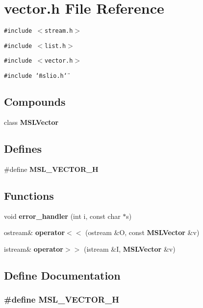 \section{vector.h File Reference}
\label{vector_8h}
{\tt \#include $<$stream.h$>$}\par
{\tt \#include $<$list.h$>$}\par
{\tt \#include $<$vector.h$>$}\par
{\tt \#include \char`\"{}mslio.h\char`\"{}}\par
\subsection*{Compounds}
\begin{CompactItemize}
\item 
class {\bf MSLVector}
\end{CompactItemize}
\subsection*{Defines}
\begin{CompactItemize}
\item 
\#define {\bf MSL\_\-VECTOR\_\-H}
\end{CompactItemize}
\subsection*{Functions}
\begin{CompactItemize}
\item 
void {\bf error\_\-handler} (int i, const char $\ast$s)
\item 
ostream\& {\bf operator$<$$<$} (ostream \&O, const {\bf MSLVector} \&v)
\item 
istream\& {\bf operator$>$$>$} (istream \&I, {\bf MSLVector} \&v)
\end{CompactItemize}


\subsection{Define Documentation}
\subsubsection{\setlength{\rightskip}{0pt plus 5cm}\#define MSL\_\-VECTOR\_\-H}\label{vector_8h_a0}


